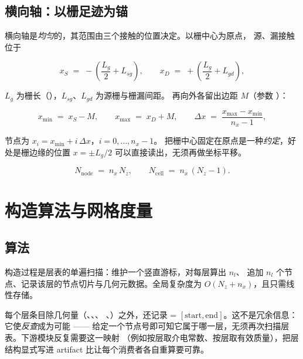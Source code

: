 \subsection{横向轴：以栅足迹为锚}
\label{sec:mesh-lateral}

横向轴是\emph{均匀}的，其范围由三个接触的位置决定。以栅中心为原点，
源、漏接触位于

\begin{equation}
x_{S} \;=\; -\left(\frac{L_g}{2}+L_{sg}\right),
\qquad
x_{D} \;=\; +\left(\frac{L_g}{2}+L_{gd}\right),
\label{eq:mesh-contacts}
\end{equation}

$L_g$ 为栅长（），$L_{sg}$、$L_{gd}$ 为源栅与栅漏间距。
再向外各留出边距 $M$（参数 ）：

\begin{equation}
x_{\min} \;=\; x_{S}-M, \qquad x_{\max} \;=\; x_{D}+M,
\qquad
\Delta x \;=\; \frac{x_{\max}-x_{\min}}{n_x-1},
\label{eq:mesh-lateral}
\end{equation}

节点为 $x_i=x_{\min}+i\,\Delta x$，$i=0,\dots,n_x-1$。
把栅中心固定在原点是一种\emph{约定}，好处是栅边缘的位置
$x=\pm L_g/2$ 可以直接读出，无须再做坐标平移。

\begin{equation}
N_{\text{node}} \;=\; n_x\,N_z,
\qquad
N_{\text{cell}} \;=\; n_x\,(N_z-1).
\label{eq:mesh-size}
\end{equation}

\section{构造算法与网格度量}
\label{sec:mesh-algorithm}

\subsection{算法}

构造过程是层表的单遍扫描：维护一个竖直游标，对每层算出 $n_l$、
追加 $n_l$ 个节点、记录该层的节点切片与几何元数据。全局复杂度为
$O(N_z+n_x)$，且只需线性存储。

每个层条目除几何量（、、、
、）之外，还记录  =
$[\text{start},\text{end}]$。这不是冗余信息：它使\emph{反查}成为可能 ——
给定一个节点号即可知它属于哪一层，无须再次扫描层表。下游模块反复需要这一映射
（例如按层取介电常数、按层取有效质量），把层结构显式写进 artifact
比让每个消费者各自重算要可靠。

